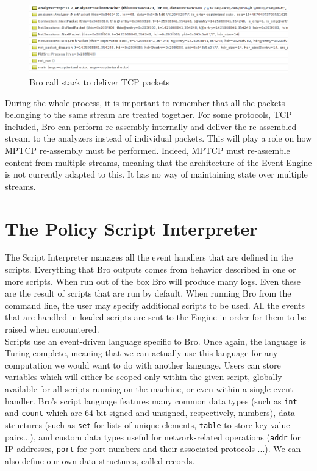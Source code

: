 \begin{figure}[!t]
\centering
\includegraphics[width = \textwidth]{Figures/brodebug.png}
\caption{Bro call stack to deliver TCP packets}
\label{pic:callstack}
\end{figure}

During the whole process, it is important to remember that all the packets belonging to the same stream are treated together. For some protocols, TCP included, Bro can perform re-assembly internally and deliver the re-assembled stream to the analyzers instead of individual packets. This will play a role on how MPTCP re-assembly must be performed. Indeed, MPTCP must re-assemble content from multiple streams, meaning that the architecture of the Event Engine is not currently adapted to this. It has no way of maintaining state over multiple streams.


\section{The Policy Script Interpreter}
The Script Interpreter manages all the event handlers that are defined in the scripts. Everything that Bro outputs comes from behavior described in one or more scripts. When run out of the box Bro will produce many logs. Even these are the result of scripts that are run by default. When running Bro from the command line, the user may specify additional scripts to be used. All the events that are handled in loaded scripts are sent to the Engine in order for them to be raised when encountered. \\

Scripts use an event-driven language specific to Bro. Once again, the language is Turing complete, meaning that we can actually use this language for any computation we would want to do with another language. Users can store variables which will either be scoped only within the given script, globally available for all scripts running on the machine, or even within a single event handler. Bro's script language features many common data types (such as \texttt{int} and \texttt{count}  which are 64-bit signed and unsigned, respectively, numbers), data structures (such as \texttt{set} for lists of unique elements, \texttt{table} to store key-value pairs...), and custom data types useful for network-related operations (\texttt{addr} for IP addresses, \texttt{port} for port numbers and their associated protocols ...). We can also define our own data structures, called records. \\

